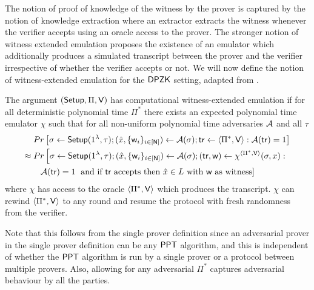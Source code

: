 The notion of proof of knowledge of the witness by the prover is captured by the notion of knowledge extraction where an extractor extracts the witness whenever the verifier accepts using an oracle access to the prover. The stronger notion of witness extended emulation \cite{Lindell03} proposes the existence of an emulator which additionally produces a simulated transcript between the prover and the verifier irrespective of whether the verifier accepts or not. We will now define the notion of witness-extended emulation for the $\mathsf{DPZK}$ setting, adapted from \cite{Groth11}. 
\begin{definition}
The argument $(\mathsf{Setup}, \Pi, \mathsf{V})$ has computational witness-extended emulation if for all deterministic polynomial time $\Pi^*$ there exists an expected polynomial time emulator $\chi$ such that for all non-uniform polynomial time adversaries $\mathcal{A}$ and all $\tau$
\begin{align*}
& Pr \left[\sigma \leftarrow \mathsf{Setup}(1^{\lambda}, \tau); (\hat{x}, \{\mathsf{w}_i\}_{i \in [\mathsf{N}]}) \leftarrow \mathcal{A}(\sigma); \mathsf{tr} \leftarrow \langle \Pi^*, \mathsf{V} \rangle: \mathcal{A}(\mathsf{tr}) = 1 \right] \\
\approx \; & Pr \left[\sigma \leftarrow \mathsf{Setup}(1^{\lambda}, \tau); (\hat{x}, \{\mathsf{w}_i\}_{i \in [\mathsf{N}]}) \leftarrow \mathcal{A}(\sigma); (\mathsf{tr}, \mathsf{w}) \leftarrow \chi^{\langle \Pi^*, \mathsf{V} \rangle}(\sigma, x): \right. \\
&\;\;\; \mathcal{A}(\mathsf{tr}) = 1 \left. \text{ and if } \mathsf{tr} \text{ accepts then } \hat{x} \in L \text{ with } \mathsf{w} \text{ as witness} \right] 
\end{align*}
where $\chi$ has access to the oracle $\langle \Pi^*, \mathsf{V} \rangle$ which produces the transcript. $\chi$ can rewind $\langle \Pi^*, \mathsf{V} \rangle$ to any round and resume the protocol with fresh randomness from the verifier.
\end{definition}
Note that this follows from the single prover definition since an adversarial prover in the single prover definition can be any $\mathsf{PPT}$ algorithm, and this is independent of whether the $\mathsf{PPT}$ algorithm is run by a single prover or a protocol between multiple provers.
Also, allowing for any adversarial $\Pi^*$ captures adversarial behaviour by all the parties.

